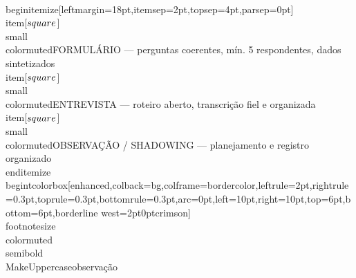 \documentclass[11pt, a4paper]{article}
\begin{document}
\\begin{itemize}[leftmargin=18pt,itemsep=2pt,topsep=4pt,parsep=0pt]
  \\item[$\\square$] {\\small\\color{muted}FORMULÁRIO — perguntas coerentes, mín. 5 respondentes, dados sintetizados}
  \\item[$\\square$] {\\small\\color{muted}ENTREVISTA — roteiro aberto, transcrição fiel e organizada}
  \\item[$\\square$] {\\small\\color{muted}OBSERVAÇÃO / SHADOWING — planejamento e registro organizado}
\\end{itemize}
\\begin{tcolorbox}[enhanced,colback=bg,colframe=bordercolor,leftrule=2pt,rightrule=0.3pt,toprule=0.3pt,bottomrule=0.3pt,arc=0pt,left=10pt,right=10pt,top=6pt,bottom=6pt,borderline west={2pt}{0pt}{crimson}]
{\\footnotesize\\color{muted}\\semibold\\MakeUppercase{observação}}\\\\[4pt]
\end{document}
